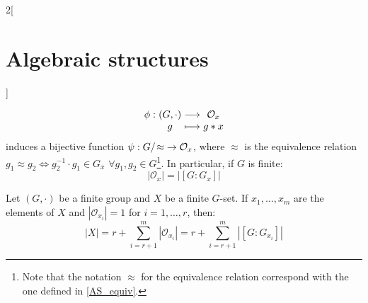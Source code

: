 \documentclass[../../../main_math.tex]{subfiles}
\begin{document}
\begin{multicols}{2}[\section{Algebraic structures}]
\begin{theorem}
    $$\function{\phi}{(G,\cdot)}{\mathcal{O}_x}{g}{g*x}$$
    induces a bijective function $\psi:\quot{G}{\!\approx}\;\rightarrow\mathcal{O}_x$, where $\approx$ is the equivalence relation $g_1\approx g_2\iff g_2^{-1}\cdot g_1\in G_x$ $\forall g_1,g_2\in G$\footnote{Note that the notation $\approx$ for the equivalence relation correspond with the one defined in \cref{AS_equiv}.}. In particular, if $G$ is finite: $$|\mathcal{O}_x|=|[G:G_x]|$$
  \end{theorem}
  \begin{corollary}
    Let $(G,\cdot)$ be a finite group and $X$ be a finite $G$-set. If $x_1,\ldots,x_m$ are the elements of $X$ and $|\mathcal{O}_{x_i}|=1$ for $i=1,\ldots,r$, then:
    \begin{equation}
      |X|=r+\sum_{i=r+1}^m|\mathcal{O}_{x_i}|=r+\sum_{i=r+1}^m|[G:G_{x_i}]|
      \label{AS_obritsformula}
    \end{equation}
  \end{corollary}

\end{multicols}
\end{document}
